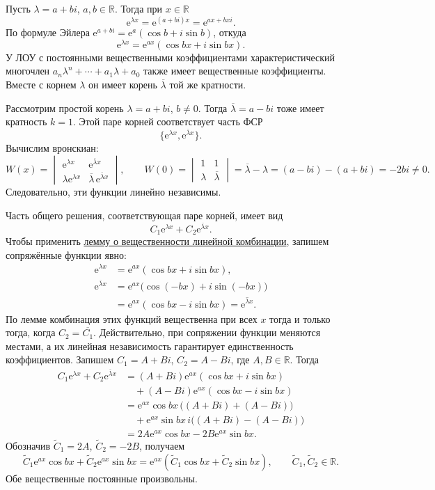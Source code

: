 \documentclass[12pt,a4paper]{article}
\numberwithin{equation}{section}
\newcommand{\R}{\mathbb{R}}
\newcommand{\e}{\mathrm{e}}
\begin{document}
Пусть \(\lambda=a+bi\), \(a,b\in\R\). Тогда при \(x\in\R\)
\[
 \e^{\lambda x}=\e^{(a+bi)x}=\e^{ax+bxi}.
\]
По формуле Эйлера \(\e^{a+bi}=\e^a(\cos b+i\sin b)\), откуда
\[
 \e^{\lambda x}=\e^{ax}(\cos bx+i\sin bx).
\]
У ЛОУ с постоянными вещественными коэффициентами характеристический
многочлен \(a_n\lambda^n+\cdots+a_1\lambda+a_0\) также имеет
вещественные коэффициенты. Вместе с корнем \(\lambda\) он имеет корень
\(\overline\lambda\) той же кратности.

Рассмотрим простой корень \(\lambda=a+bi\), \(b\ne0\). Тогда
\(\overline\lambda=a-bi\) тоже имеет кратность \(k=1\). Этой паре
корней соответствует часть ФСР
\[
 \bigl\{\e^{\lambda x},\e^{\overline\lambda x}\bigr\}.
\]
Вычислим вронскиан:
\[
 W(x)=
 \begin{vmatrix}
  \e^{\lambda x}&\e^{\overline\lambda x}\\
  \lambda\e^{\lambda x}&\overline\lambda\,\e^{\overline\lambda x}
 \end{vmatrix},\qquad
 W(0)=
 \begin{vmatrix}1&1\\ \lambda&\overline\lambda\end{vmatrix}
 =\overline\lambda-\lambda=(a-bi)-(a+bi)=-2bi\ne0.
\]
Следовательно, эти функции линейно независимы.

Часть общего решения, соответствующая паре корней, имеет вид
\[
 C_1\e^{\lambda x}+C_2\e^{\overline\lambda x}.
\]
Чтобы применить \hyperref[lem:real-linear-combination]{лемму о вещественности
линейной комбинации}, запишем сопряжённые функции явно:
\[
\begin{aligned}
 \e^{\lambda x}
 &=\e^{ax}(\cos bx+i\sin bx),\\
 \e^{\overline\lambda x}
 &=\e^{ax}\bigl(\cos(-bx)+i\sin(-bx)\bigr)\\
 &=\e^{ax}(\cos bx-i\sin bx)=\overline{\e^{\lambda x}}.
\end{aligned}
\]
По лемме комбинация этих функций вещественна при всех \(x\) тогда и только тогда,
когда \(C_2=\overline{C_1}\). Действительно, при сопряжении функции меняются
местами, а их линейная независимость гарантирует единственность коэффициентов. Запишем \(C_1=A+Bi\), \(C_2=A-Bi\),
где \(A,B\in\R\). Тогда
\[
\begin{aligned}
 C_1\e^{\lambda x}+C_2\e^{\overline\lambda x}
 &= (A+Bi)\e^{ax}(\cos bx+i\sin bx)\\
 &\quad +(A-Bi)\e^{ax}(\cos bx-i\sin bx)\\
 &= \e^{ax}\cos bx\,\bigl((A+Bi)+(A-Bi)\bigr)\\
 &\quad +\e^{ax}\sin bx\,i\bigl((A+Bi)-(A-Bi)\bigr)\\
 &=2A\e^{ax}\cos bx-2B\e^{ax}\sin bx.
\end{aligned}
\]
Обозначив \(\widetilde C_1=2A\), \(\widetilde C_2=-2B\), получаем
\[
 \widetilde C_1\e^{ax}\cos bx+\widetilde C_2\e^{ax}\sin bx
 =\e^{ax}(\widetilde C_1\cos bx+\widetilde C_2\sin bx),
 \qquad \widetilde C_1,\widetilde C_2\in\R.
\]
Обе вещественные постоянные произвольны.
\end{document}
